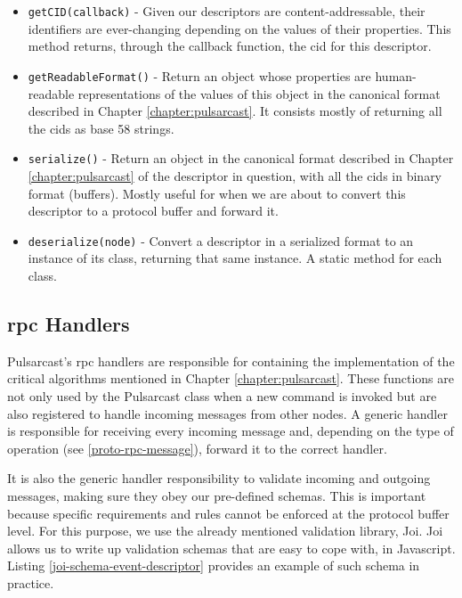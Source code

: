 \begin{itemize}
  \item
    \verb|getCID(callback)| - Given our descriptors are content-addressable, their identifiers are ever-changing depending on the values of their properties. This method returns, through the callback function, the \acrshort{cid} for this descriptor.
  \item
    \verb|getReadableFormat()| - Return an object whose properties are human-readable representations of the values of this object in the canonical format described in Chapter \ref{chapter:pulsarcast}. It consists mostly of returning all the \acrshort{cid}s as base 58 strings.
  \item
    \verb|serialize()| - Return an object in the canonical format described in Chapter \ref{chapter:pulsarcast} of the descriptor in question, with all the \acrshort{cid}s in binary format (buffers). Mostly useful for when we are about to convert this descriptor to a protocol buffer and forward it.
  \item
    \verb|deserialize(node)| - Convert a descriptor in a serialized format to an instance of its class, returning that same instance. A static method for each class.
\end{itemize}


\subsection{\acrshort{rpc} Handlers}\label{subsec:rpc-handlers}

Pulsarcast's \acrshort{rpc} handlers are responsible for containing the
implementation of the critical algorithms mentioned in Chapter
\ref{chapter:pulsarcast}. These functions are not only used by the Pulsarcast
class when a new command is invoked but are also registered to handle incoming
messages from other nodes.  A generic handler is responsible for receiving
every incoming message and, depending on the type of operation (see
\ref{proto-rpc-message}), forward it to the correct handler.

It is also the generic handler responsibility to validate incoming and outgoing
messages, making sure they obey our pre-defined schemas. This is important
because specific requirements and rules cannot be enforced at the protocol
buffer level. For this purpose, we use the already mentioned validation
library, Joi. Joi allows us to write up validation schemas that are easy to
cope with, in Javascript. Listing \ref{joi-schema-event-descriptor} provides an
example of such schema in practice.

